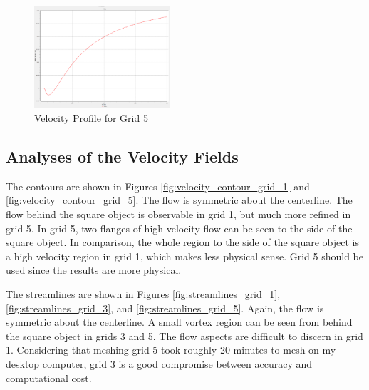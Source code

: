 \begin{figure}[H]
    \centering
    \includegraphics[width=0.45\textwidth]{Questions/Figures/u velocity along centerline grid 5.png}
    \caption{Velocity Profile for Grid 5}
    \label{fig:velocity_profile_grid_5}
\end{figure}

\subsection{Analyses of the Velocity Fields}
The contours are shown in Figures \ref{fig:velocity_contour_grid_1} and \ref{fig:velocity_contour_grid_5}. The flow is symmetric about the centerline. The flow behind the square object is observable in grid 1, but much more refined in grid 5. In grid 5, two flanges of high velocity flow can be seen to the side of the square object. In comparison, the whole region to the side of the square object is a high velocity region in grid 1, which makes less physical sense. Grid 5 should be used since the results are more physical.

The streamlines are shown in Figures \ref{fig:streamlines_grid_1}, \ref{fig:streamlines_grid_3}, and \ref{fig:streamlines_grid_5}. Again, the flow is symmetric about the centerline. A small vortex region can be seen from behind the square object in grids 3 and 5. The flow aspects are difficult to discern in grid 1. Considering that meshing grid 5 took roughly 20 minutes to mesh on my desktop computer, grid 3 is a good compromise between accuracy and computational cost.

